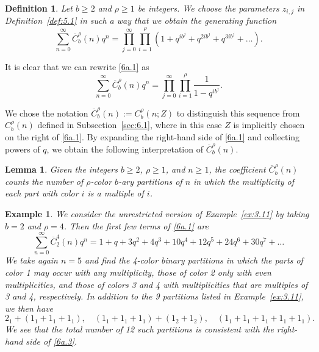 \documentclass{amsart}
\theoremstyle{plain}
\newtheorem{definition}[theorem]{Definition}
\newtheorem{example}[theorem]{Example}
\newtheorem{lemma}[theorem]{Lemma}
\numberwithin{equation}{section}
\begin{document}
\begin{definition}\label{def:6.6}
Let $b\geq 2$ and $\rho\geq 1$ be integers. We choose the parameters $z_{i,j}$ 
in Definition~\ref{def:5.1} in such a way that we obtain the generating 
function
\begin{equation}\label{6a.1}
\sum_{n=0}^\infty\overline{C}_b^\rho(n)q^n=\prod_{j=0}^\infty\prod_{i=1}^\rho
\left(1+q^{ib^j}+q^{2ib^j}+q^{3ib^j}+\dots\right).
\end{equation}
\end{definition}

It is clear that we can rewrite \eqref{6a.1} as
\begin{equation}\label{6a.2}
\sum_{n=0}^\infty\overline{C}_b^\rho(n)q^n=\prod_{j=0}^\infty\prod_{i=1}^\rho
\frac{1}{1-q^{ib^j}}.
\end{equation}

We chose the notation $\overline{C}_b^\rho(n):=C_b^\rho(n;Z)$ to distinguish 
this sequence from $C_b^\rho(n)$ defined in Subsection~\ref{sec:6.1}, where 
in this case $Z$ is implicitly chosen on the right of \eqref{6a.1}. 
By expanding the 
right-hand side of \eqref{6a.1} and collecting powers of $q$, we obtain the
following interpretation of $\overline{C}_b^\rho(n)$.

\begin{lemma}\label{lem:6.7}
Given the integers $b\geq 2$, $\rho\geq 1$, and $n\geq 1$, the coefficient
$\overline{C}_b^\rho(n)$ counts the number of $\rho$-color $b$-ary partitions
of $n$ in which the multiplicity of each part with color $i$ is a multiple
of $i$.
\end{lemma}

\begin{example}\label{ex:6.8}
{\rm We consider the unrestricted version of Example~\ref{ex:3.11} by taking
$b=2$ and $\rho=4$. Then the first few terms of \eqref{6a.1} are
\begin{equation}\label{6a.3}
\sum_{n=0}^\infty\overline{C}_2^4(n)q^n
=1+q+3q^2+4q^3+10q^4+12q^5+24q^6+30q^7+\dots
\end{equation}
We take again $n=5$ and find the 4-color binary partitions in which the parts
of color 1 may occur with any multiplicity, those of color 2 only with even
multiplicities, and those of colors 3 and 4 with multiplicities that are 
multiples of 3 and 4, respectively. In addition to the 9 partitions listed in
Example~\ref{ex:3.11}, we then have
\[
2_1+(1_1+1_1+1_1),\quad (1_1+1_1+1_1)+(1_2+1_2),\quad (1_1+1_1+1_1+1_1+1_1).
\]
We see that the total number of 12 such partitions is consistent with the 
right-hand side of \eqref{6a.3}.}
\end{example}
\end{document}

